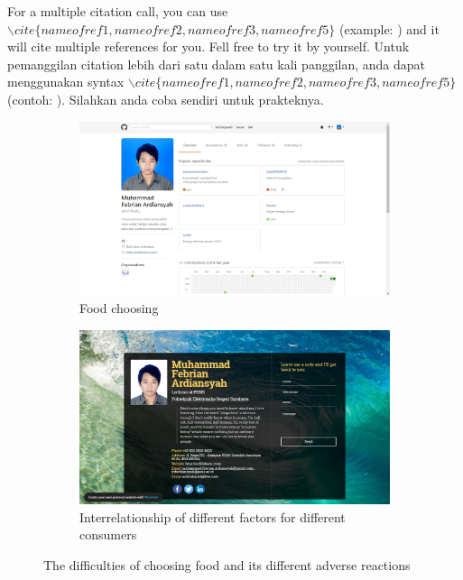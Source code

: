 \documentclass[preprint]{elsarticle}
\begin{document}
\vfill
For a multiple citation call, you can use $\backslash cite\{nameofref1, nameofref2, nameofref3, nameofref5\}$ (example: \cite{nameofref1, nameofref2, nameofref3, nameofref5}) and it will cite multiple references for you. Fell free to try it by yourself. Untuk pemanggilan citation lebih dari satu dalam satu kali panggilan, anda dapat menggunakan syntax $\backslash cite\{nameofref1, nameofref2, nameofref3, nameofref5\}$ (contoh: \cite{nameofref1, nameofref2, nameofref3, nameofref5}). Silahkan anda coba sendiri untuk prakteknya.

\begin{figure}
  \centering
   \begin{subfigure}[b]{0.48\textwidth}
       \includegraphics[width=\textwidth, keepaspectratio]{github}
       \caption{Food choosing}
       \label{fig:fig1a}
   \end{subfigure}
   \begin{subfigure}[b]{0.48\textwidth}
       \includegraphics[width=\textwidth, keepaspectratio]{intro}
       \caption{Interrelationship of different factors for different consumers}
       \label{fig:fig1b}
   \end{subfigure}
   \caption{The difficulties of choosing food and its different adverse reactions}\label{fig1}
\end{figure}
\end{document}
